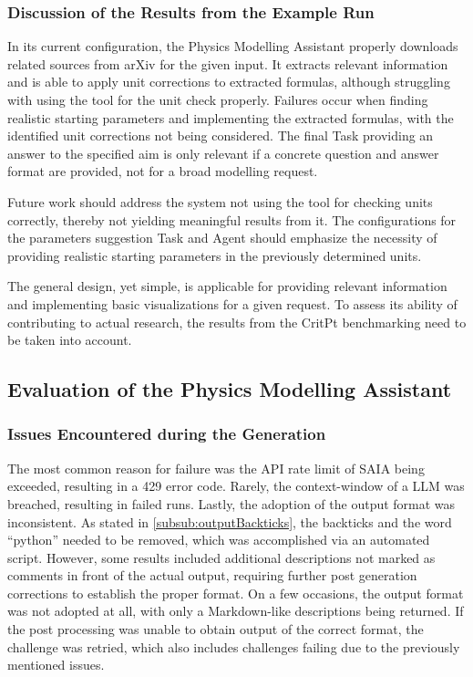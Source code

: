 \documentclass[
	fontsize = 11pt,
	paper = a4,
	draft = false,
	twoside = true,
	titlepage = false
]{scrartcl}
\numberwithin{equation}{subsection}
\begin{document}
	\subsubsection{Discussion of the Results from the Example Run}
	In its current configuration, the Physics Modelling Assistant properly downloads related sources from arXiv for the given input. It extracts relevant information and is able to apply unit corrections to extracted formulas, although struggling with using the tool for the unit check properly. Failures occur when finding realistic starting parameters and implementing the extracted formulas, with the identified unit corrections not being considered. The final Task providing an answer to the specified aim is only relevant if a concrete question and answer format are provided, not for a broad modelling request. 
	
	Future work should address the system not using the tool for checking units correctly, thereby not yielding meaningful results from it. The configurations for the parameters suggestion Task and \gls{Agent} should emphasize the necessity of providing realistic starting parameters in the previously determined units.
	
	The general design, yet simple, is applicable for providing relevant information and implementing basic visualizations for a given request. To assess its ability of contributing to actual research, the results from the CritPt benchmarking need to be taken into account.
	
	\subsection{Evaluation of the Physics Modelling Assistant}
	\subsubsection{Issues Encountered during the Generation} \label{res:issues}
	The most common reason for failure was the API rate limit of SAIA \autocite{saiaModels} being exceeded, resulting in a 429 error code. Rarely, the \gls{context-window} of a \gls{LLM} was breached, resulting in failed runs. Lastly, the adoption of the output format was inconsistent. As stated in \autoref{subsub:outputBackticks}, the backticks and the word \enquote{python} needed to be removed, which was accomplished via an automated script. However, some results included additional descriptions not marked as comments in front of the actual output, requiring further post generation corrections to establish the proper format. On a few occasions, the output format was not adopted at all, with only a Markdown-like descriptions being returned. If the post processing was unable to obtain output of the correct format, the challenge was retried, which also includes challenges failing due to the previously mentioned issues.
\end{document}
